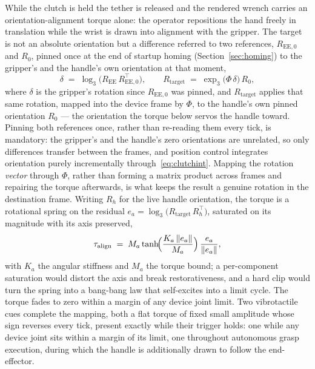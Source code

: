 \documentclass[12pt,a4paper,twoside,openright]{report}
\begin{document}
While the clutch is held the tether is released and the rendered wrench carries an orientation-alignment torque alone: the operator repositions the hand freely in translation while the wrist is drawn into alignment with the gripper. The target is not an absolute orientation but a difference referred to two references, $R_{\text{EE},0}$ and $R_0$, pinned once at the end of startup homing (Section~\ref{sec:homing}) to the gripper's and the handle's own orientation at that moment,
\begin{equation}
\delta \;=\; \log_3\!\bigl(R_{\text{EE}}\,R_{\text{EE},0}^{\top}\bigr),
\qquad
R_{\text{target}} \;=\; \exp_3\!\bigl(\Phi\,\delta\bigr)\, R_0,
\label{eq:clutchalign}
\end{equation}
where $\delta$ is the gripper's rotation since $R_{\text{EE},0}$ was pinned, and $R_{\text{target}}$ applies that same rotation, mapped into the device frame by $\Phi$, to the handle's own pinned orientation $R_0$ --- the orientation the torque below servos the handle toward. Pinning both references once, rather than re-reading them every tick, is mandatory: the gripper's and the handle's zero orientations are unrelated, so only differences transfer between the frames, and position control integrates orientation purely incrementally through~\eqref{eq:clutchint}. Mapping the rotation \emph{vector} through $\Phi$, rather than forming a matrix product across frames and repairing the torque afterwards, is what keeps the result a genuine rotation in the destination frame. Writing $R_h$ for the live handle orientation, the torque is a rotational spring on the residual $e_a = \log_3\!\bigl(R_{\text{target}}\,R_h^{\top}\bigr)$, saturated on its magnitude with its axis preserved,
\begin{equation}
\tau_{\text{align}} \;=\; M_a \tanh\!\Bigl(\frac{K_a\,\| e_a \|}{M_a}\Bigr)\,\frac{e_a}{\| e_a \|},
\label{eq:aligntorque}
\end{equation}
with $K_a$ the angular stiffness and $M_a$ the torque bound; a per-component saturation would distort the axis and break restorativeness, and a hard clip would turn the spring into a bang-bang law that self-excites into a limit cycle. The torque fades to zero within a margin of any device joint limit. Two vibrotactile cues complete the mapping, both a flat torque of fixed small amplitude whose sign reverses every tick, present exactly while their trigger holds: one while any device joint sits within a margin of its limit, one throughout autonomous grasp execution, during which the handle is additionally drawn to follow the end-effector.
\end{document}
